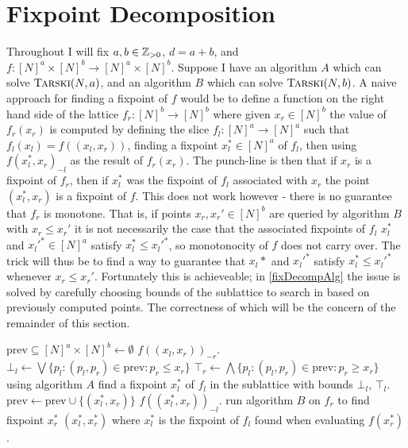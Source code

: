 \section{Fixpoint Decomposition} \label{fixDecompChapter}
Throughout I will fix $a, b \in \mathbb{Z}_{> 0}$,
$d = a + b$, and $f : [N]^a \times [N]^b \to [N]^a \times [N]^b$.
Suppose I have an algorithm $A$ which can solve $\textsc{Tarski}(N, a)$,
and an algorithm $B$ which can solve $\textsc{Tarski}(N, b)$. A naive approach 
for finding a fixpoint of $f$ would be to define a
function on the right hand side of the lattice
$f_r : [N]^b \to [N]^b$ where given $x_r \in [N]^b$ the value of 
$f_r(x_r)$
is computed by defining the slice $f_l : [N]^a \to [N]^a$
such that $f_l(x_l) = f((x_l, x_r))$, finding a fixpoint $x_l^* \in [N]^a$
of $f_l$, then using $f(x_l^*, x_r)_{-l}$ as the result of $f_r(x_r)$.
The punch-line is then that if $x_r$ is a fixpoint of $f_r$, then if
$x_l^*$ was the fixpoint of $f_l$ associated with $x_r$ the point
$(x_l^*, x_r)$ is a fixpoint of $f$. This does not work however -
there is no guarantee that $f_r$ is monotone. That is,
if points $x_r, x_r' \in [N]^b$ are queried by algorithm $B$
with $x_r \leq x_r'$ it is not necessarily the case that the associated
fixpoints of $f_l$ $x_l^*$ and $x_l'^* \in [N]^a$ satisfy $x_l^* \leq x_l'^*$, so
monotonocity of $f$ does not carry over. The trick will thus be
to find a way to guarantee that $x_l*$ and $x_l'^*$ satisfy 
$x_l^* \leq x_l'^*$ whenever $x_r \leq x_r'$. Fortunately
this is achieveable; in \cref{fixDecompAlg} the issue is solved
by carefully choosing bounds of the sublattice to search in based
on previously computed points. The correctness of which will be
the concern of the remainder of this section.

\begin{algorithm}[h]
  \caption{\citep{fasterTarski}}\label{fixDecompAlg}
  \begin{algorithmic}[1]
    \State $\text{prev} \subseteq [N]^a \times [N]^b \gets \emptyset$
        \Return $f((x_l, x_r))_{-r}$.
      \EndProcedure
      \State $\bot_l \gets \bigvee\{p_l : (p_l, p_r) \in \text{prev} : p_r \leq x_r \}$
      \State $\top_r \gets \bigwedge\{p_l : (p_l, p_r) \in \text{prev} : p_r \geq x_r \}$
      \State using algorithm $A$ find a fixpoint $x_l^*$ of $f_l$ in the sublattice with bounds
      $\bot_l$, $\top_l$.
      \State $\text{prev} \gets \text{prev} \cup \{(x_l^*, x_r)\}$
      \State \Return $f((x_l^*, x_r))_{-l}$.
    \EndProcedure
    \State run algorithm $B$ on $f_r$ to find fixpoint $x_r^*$
    \State \Return $(x_l^*, x_r^*)$ where $x_l^*$ is the fixpoint of $f_l$ 
    found when evaluating $f(x_r^*)$.
  \EndProcedure
  \end{algorithmic}
\end{algorithm}

